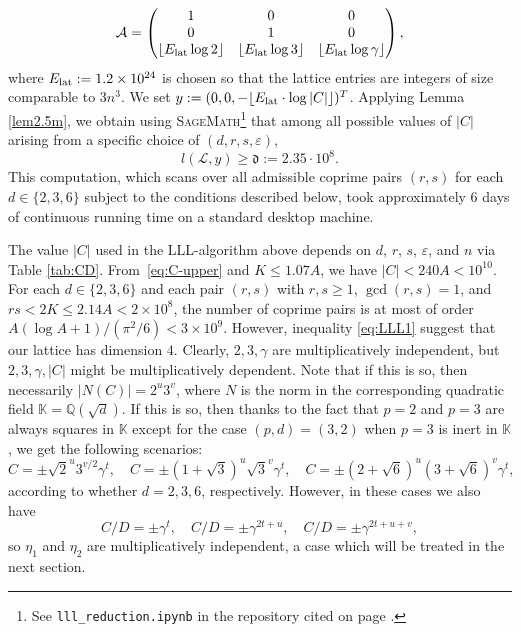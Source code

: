 \documentclass[11pt,a4paper]{article}
\numberwithin{equation}{section}
\numberwithin{table}{section}
\numberwithin{figure}{section}
\begin{document}
\begin{equation*}
	\mathcal{A} = \begin{pmatrix}
		1 & 0 & 0 \\
		0 & 1 & 0 \\
		\lfloor E_{\rm lat}\log 2\rfloor &
		\lfloor E_{\rm lat}\log 3\rfloor &
		\lfloor E_{\rm lat}\log\gamma\rfloor
	\end{pmatrix},
\end{equation*}
where $E_{\rm lat} := 1.2\times 10^{24}$ is chosen so that the lattice entries are integers of size comparable to $3n^3$. We set $y := (0,0,-\lfloor E_{\rm lat}\cdot\log|C|\rfloor)^T$. Applying Lemma \ref{lem2.5m}, we obtain using \textsc{SageMath}\footnote{See \texttt{lll\_reduction.ipynb} in the repository cited on page \pageref{fn:github}.} that among all possible values of $|C|$ arising from a specific choice of $(d,r,s,\varepsilon)$,
\[
 l\left(\mathcal{L},y\right)\ge \mathfrak{d} := 2.35\cdot 10^{8}. 
\]
This computation, which scans over all admissible coprime pairs $(r,s)$ for each $d \in \{2,3,6\}$ subject to the conditions described below, took approximately 6 days of continuous running time on a standard desktop machine.
\medskip

The value $|C|$ used in the LLL-algorithm above depends on $d$, $r$, $s$, $\varepsilon$, and $n$ via Table \ref{tab:CD}. From~\eqref{eq:C-upper} and $K \leq 1.07A$, we have $|C| < 240A < 10^{10}$. For each $d \in \{2,3,6\}$ and each pair $(r,s)$ with $r,s \geq 1$, $\gcd(r,s) = 1$, and $rs < 2K \leq 2.14A < 2\times 10^8$, the number of coprime pairs is at most
of order $A (\log A+1) /(\pi^2/6) < 3\times 10^{9}$. However, inequality \eqref{eq:LLL1} suggest that our lattice has dimension $4$. Clearly, $2,3,\gamma$ are multiplicatively independent, but $2,3,\gamma,|C|$ might be multiplicatively dependent. Note that if this is so, then necessarily $|N(C)|=2^u3^v$, where $N$ is the norm in the corresponding quadratic field ${\mathbb K}={\mathbb Q}({\sqrt{d}})$. If this is so, then thanks to the fact that $p=2$ and $p=3$ are always squares in ${\mathbb K}$  except for the case $(p,d)=(3,2)$ when $p=3$ is inert in ${\mathbb K}$, we get the following scenarios:
$$
C=\pm {\sqrt{2}}^u 3^{v/2} \gamma^t,\quad C=\pm (1+{\sqrt{3}})^u {\sqrt{3}}^v \gamma^t,\quad C=\pm (2+{\sqrt{6}})^u (3+{\sqrt{6}})^v\gamma^t,
$$
according to whether $d=2,3,6$, respectively. However, in these cases we also have 
$$
C/D=\pm \gamma^{t},\quad C/D=\pm \gamma^{2t+u},\quad C/D=\pm \gamma^{2t+u+v},
$$
so $\eta_1$ and $\eta_2$ are multiplicatively independent, a case which will be treated in the next section. 
\end{document}
